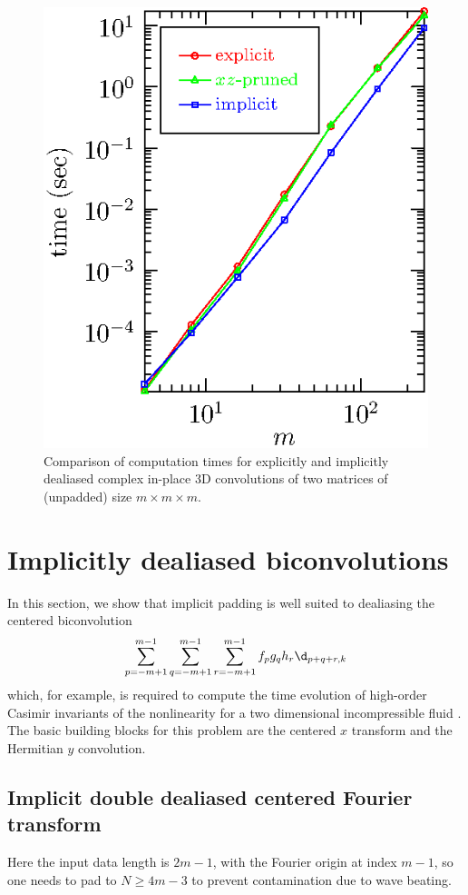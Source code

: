 \documentclass[final]{siamltex}
\begin{document}
\begin{figure}[htbp]
\begin{center}
\includegraphics{timing3c}
\caption{Comparison of computation times for explicitly and implicitly
dealiased complex in-place 3D convolutions of two matrices of
(unpadded) size $m\times m\times m$.}
\label{timing3c}
\end{center}
\end{figure}

\section{Implicitly dealiased biconvolutions}\label{hyperconv}
In this section, we show that implicit padding is well suited to
dealiasing the centered biconvolution
$$
\sum_{p=-m+1}^{m-1}\sum_{q=-m+1}^{m-1}\sum_{r=-m+1}^{m-1} f_p g_q h_r\d_{p+q+r,k}
$$
which, for example, is required to compute the time evolution of high-order
Casimir invariants of the nonlinearity for a two dimensional incompressible
fluid \cite{Bowman10}. The basic building blocks for this problem are the
centered $x$ transform and the Hermitian $y$ convolution.
\subsection{Implicit double dealiased centered Fourier transform}
\label{fft0bi}
Here the input data length is $2m-1$, with the Fourier origin at index
$m-1$, so one needs to pad to $N\ge 4m-3$ to prevent contamination due to
wave beating.
\end{document}
